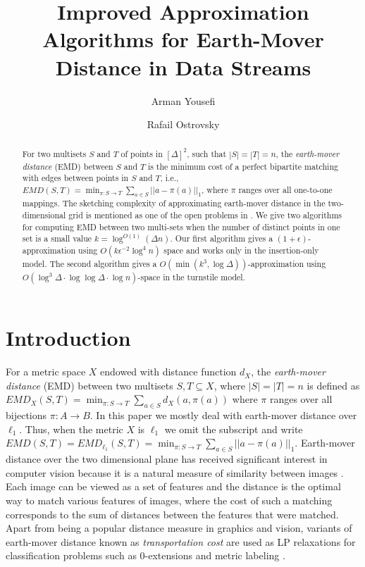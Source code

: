 \documentclass[oribibl]{llncs}
\title{Improved Approximation Algorithms for Earth-Mover
Distance in Data Streams}
\author{Arman Yousefi\and Rafail Ostrovsky}
\institute{University of California Los Angeles\\
\email{\{armany, rafail\}@cs.ucla.edu}}
\begin{document}
\maketitle

\begin{abstract}
For two multisets $S$ and $T$ of points in $[\Delta]^2$,
such that $|S| = |T|= n$,
the \textit{earth-mover distance} (EMD) between $S$ and $T$ is the minimum cost
of a perfect bipartite matching with edges between points in $S$ and $T$, i.e., 
$EMD(S,T) = \min_{\pi:S\rightarrow T}\sum_{a\in S}||a-\pi(a)||_1$,
where $\pi$ ranges over all one-to-one mappings. The sketching complexity of
approximating earth-mover distance in the two-dimensional grid is mentioned
as one of the open problems in \cite{openproblems1, openproblems2}. 
We give two algorithms for computing EMD between two multi-sets when
the number of distinct points in one set is a small value
$k=\log^{O(1)}(\Delta n)$.
Our first algorithm gives a $(1+\epsilon)$-approximation using
$O(k\epsilon^{-2}\log^{4}n)$ space and works only in the
insertion-only model.
The second algorithm gives a $O(\min(k^3,\log\Delta))$-approximation
using $O(\log^{3}\Delta\cdot\log\log\Delta\cdot\log n)$-space in the turnstile model. 
\end{abstract}

\section{Introduction}
For a metric space $X$ endowed with distance function $d_X$,
the \textit{earth-mover distance} (EMD) between two multisets $S,T\subseteq X$,
where $|S|=|T|=n$ is defined as
$EMD_X(S,T) = \min_{\pi:S\rightarrow T}\sum_{a\in S}d_X(a,\pi(a))$
where $\pi$ ranges over all bijections $\pi:A\rightarrow B$.
In this paper we mostly deal with earth-mover distance over $\ell_1$.
Thus, when the metric $X$ is $\ell_1$ we omit the subscript and 
write $EMD(S,T)=EMD_{\ell_1}(S,T)
=\min_{\pi:S\rightarrow T}\sum_{a\in S}||a-\pi(a)||_1$.
Earth-mover distance over the two dimensional plane has received significant
interest in computer vision because it is a natural measure of
similarity between images \cite{tommasi, tommasi2, grayspace, thaper}.
Each image can be viewed as a set of features and the distance is the optimal
way to match various features of images, where the
cost of such a matching corresponds to the sum of distances between the features
that were matched.
Apart from being a popular
distance measure in graphics and vision, variants of earth-mover distance known
as \textit{transportation cost} are used as LP relaxations for
classification problems such as 0-extensions and metric labeling
\cite{classification_metric, metric_labeling, charikar}.
\end{document}
